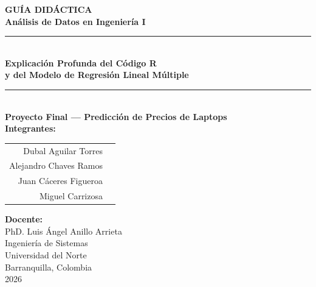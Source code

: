 \documentclass[12pt,a4paper]{article}
\begin{document}
\begin{titlepage}
    
    \vspace*{4cm}
    
    \begin{center}
        {\Huge\bfseries\textcolor{azuloscuro}{GUÍA DIDÁCTICA}}\\[0.5cm]
        {\LARGE\bfseries\textcolor{azulclaro}{Análisis de Datos en Ingeniería I}}\\[1cm]
        
        \rule{0.8\textwidth}{1.5pt}\\[0.8cm]
        
        {\Large\textbf{Explicación Profunda del Código R}}\\[0.3cm]
        {\Large\textbf{y del Modelo de Regresión Lineal Múltiple}}\\[1.5cm]
        
        \rule{0.6\textwidth}{0.5pt}\\[1cm]
        
        {\large\textbf{Proyecto Final --- Predicción de Precios de Laptops}}\\[1.5cm]
        
        {\large\textbf{Integrantes:}}\\[0.5cm]
        \begin{tabular}{rl}
            Dubal Aguilar Torres & \\
            Alejandro Chaves Ramos & \\
            Juan Cáceres Figueroa & \\
            Miguel Carrizosa & \\
        \end{tabular}
        
        \vfill
        
        {\large\textbf{Docente:}}\\[0.3cm]
        PhD. Luis Ángel Anillo Arrieta\\[1cm]
        
        {\large Ingeniería de Sistemas}\\[0.3cm]
        {\large Universidad del Norte}\\[0.3cm]
        {\large Barranquilla, Colombia}\\[0.5cm]
        {\large 2026}
        
    \end{center}
\end{titlepage}
\end{document}
